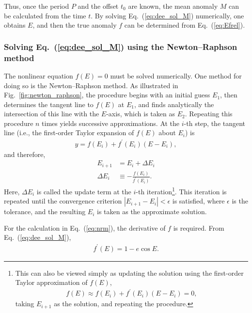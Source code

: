 Thus, once the period $P$ and the offset $t_0$ are known, the mean anomaly $M$ can be calculated from the time $t$. By solving Eq.~(\ref{eq:dee_sol_M}) numerically, one obtains $E$, and then the true anomaly $f$ can be determined from Eq.~(\ref{eq:Efrel}).\\

\subsubsection{Solving Eq.~(\ref{eq:dee_sol_M}) using the Newton–Raphson method}

The nonlinear equation $f(E)=0$ must be solved numerically. One method for doing so is the Newton–Raphson method. As illustrated in Fig.~\ref{fig:newton_raphson}, the procedure begins with an initial guess $E_1$, then determines the tangent line to $f(E)$ at $E_1$, and finds analytically the intersection of this line with the $E$-axis, which is taken as $E_2$. Repeating this procedure $n$ times yields successive approximations. At the $i$-th step, the tangent line (i.e., the first-order Taylor expansion of $f(E)$ about $E_i$) is
\begin{align}
\label{eq:nrm}
y = f(E_i) + f^\prime(E_i) (E - E_i) ,
\end{align}
and therefore,
\begin{align}
\label{eq:update_newton}
E_{i+1} &= E_i + \Delta E_i \\
\Delta E_i &\equiv - \frac{f(E_i)}{f^\prime(E_i)} .
\end{align}
Here, $\Delta E_i$ is called the update term at the $i$-th iteration\footnote{This can also be viewed simply as updating the solution using the first-order Taylor approximation of $f(E)$,
\begin{align}
\label{eq:nrm_f}
f(E) \approx f(E_i) + f^\prime(E_i) (E - E_i) = 0 ,
\end{align}
taking $E_{i+1}$ as the solution, and repeating the procedure.}. This iteration is repeated until the convergence criterion $|E_{i+1} - E_i| < \epsilon$ is satisfied, where $\epsilon$ is the tolerance, and the resulting $E_i$ is taken as the approximate solution.

For the calculation in Eq.~(\ref{eq:nrm}), the derivative of $f$ is required. From Eq.~(\ref{eq:dee_sol_M}),
\begin{align}
f^\prime(E) = 1 - e \cos{E} .
\end{align}


